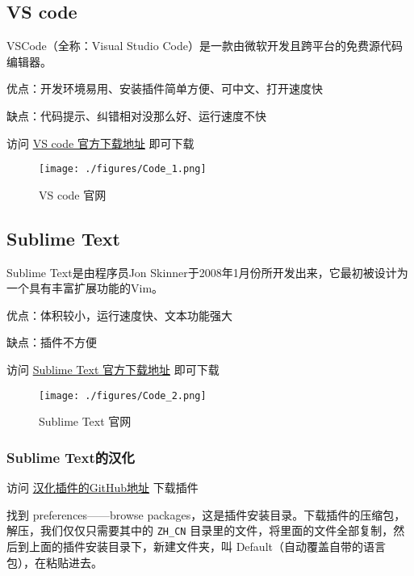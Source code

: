 
\begin{issues}
\issueTODO
\end{issues}

\subsection{VS code}

VSCode（全称：Visual Studio Code）是一款由微软开发且跨平台的免费源代码编辑器。

优点：开发环境易用、安装插件简单方便、可中文、打开速度快

缺点：代码提示、纠错相对没那么好、运行速度不快

访问 \href{https://code.visualstudio.com/}{VS code 官方下载地址} 即可下载

\begin{figure}[ht]
\centering
\texttt{[image: ./figures/Code\_1.png]}
\caption{VS code 官网} \label{Code_fig1}
\end{figure}

\subsection{Sublime Text}

Sublime Text是由程序员Jon Skinner于2008年1月份所开发出来，它最初被设计为一个具有丰富扩展功能的Vim。

优点：体积较小，运行速度快、文本功能强大

缺点：插件不方便

访问 \href{https://www.sublimetext.com/}{Sublime Text 官方下载地址} 即可下载

\begin{figure}[ht]
\centering
\texttt{[image: ./figures/Code\_2.png]}
\caption{Sublime Text 官网} \label{Code_fig2}
\end{figure}

\subsubsection{Sublime Text的汉化}

访问 \href{https://github.com/rexdf/ChineseLocalization}{汉化插件的GitHub地址} 下载插件

找到 preferences——browse packages，这是插件安装目录。下载插件的压缩包，解压，我们仅仅只需要其中的 \verb|ZH_CN| 目录里的文件，将里面的文件全部复制，然后到上面的插件安装目录下，新建文件夹，叫 Default（自动覆盖自带的语言包），在粘贴进去。



